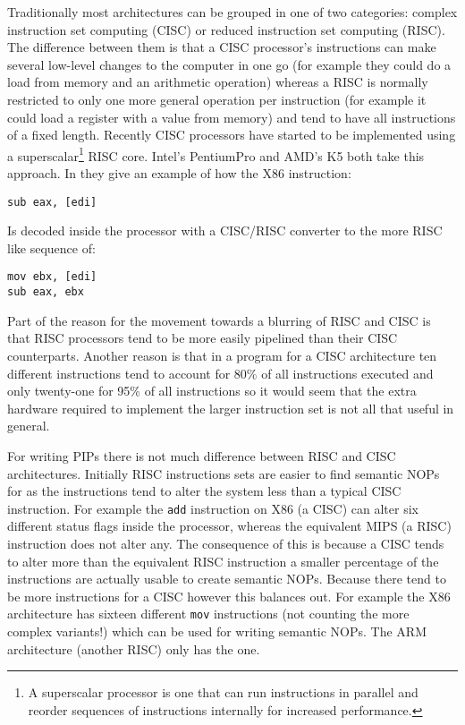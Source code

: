 \documentclass[10pt]{book}
\begin{document}
Traditionally most architectures can be grouped in one of two
categories: complex instruction set computing (CISC) or reduced
instruction set computing (RISC). The difference between them is that a
CISC processor's instructions can make several low-level changes to the
computer in one go (for example they could do a load from memory and an
arithmetic operation) whereas a RISC is normally restricted to only one
more general operation per instruction (for example it could load a
register with a value from memory) and tend to have all instructions of
a fixed length. Recently CISC processors have started to be implemented
using a superscalar\footnote{A superscalar processor is one that can run
  instructions in parallel and reorder sequences of instructions
  internally for increased performance.} RISC
core\autocite{Sima:1997tv}. Intel's PentiumPro and AMD's K5 both take
this approach. In \autocite{Sima:1997tv} they give an example of how the
X86 instruction:

\begin{lstlisting}
sub eax, [edi]
\end{lstlisting}
Is decoded inside the processor with a CISC/RISC converter to the more
RISC like sequence of:

\begin{lstlisting}
mov ebx, [edi]
sub eax, ebx
\end{lstlisting}
Part of the reason for the movement towards a blurring of RISC and CISC
is that RISC processors tend to be more easily pipelined than their CISC
counterparts\autocite{Stallings:1988ix}. Another reason is that in a
program for a CISC architecture ten different instructions tend to
account for 80\% of all instructions executed and only twenty-one for
95\% of all instructions\autocite{Alexander:1975ul} so it would seem
that the extra hardware required to implement the larger instruction set
is not all that useful in general.

For writing PIPs there is not much difference between RISC and CISC
architectures. Initially RISC instructions sets are easier to find
semantic NOPs for as the instructions tend to alter the system less than
a typical CISC instruction. For example the \lstinline!add! instruction
on X86 (a CISC) can alter six different status flags inside the
processor\autocite{IntelCorporation:1997ta}, whereas the equivalent MIPS
(a RISC) instruction does not alter
any\autocite{MIPSTechnologiesInc:2011ta}. The consequence of this is
because a CISC tends to alter more than the equivalent RISC instruction
a smaller percentage of the instructions are actually usable to create
semantic NOPs. Because there tend to be more instructions for a CISC
however this balances out. For example the X86 architecture has sixteen
different \lstinline!mov! instructions (not counting the more complex
variants!) which can be used for writing semantic NOPs\autocite{refx86}.
The ARM architecture (another RISC) only has the
one\autocite{Limited:vc}.
\end{document}

